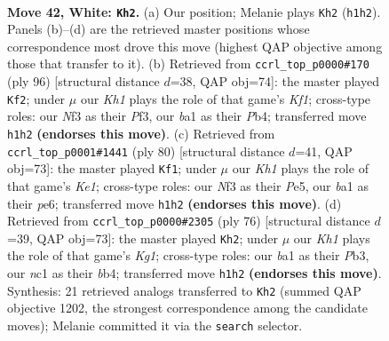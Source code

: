 \documentclass[11pt]{article}
\begin{document}
\clearpage

\begin{figure}[p]\centering
\begin{subfigure}{0.46\textwidth}\centering
\resizebox{\linewidth}{!}{%
\newchessgame
\chessboard[
  setfen={6k1/1p3p2/6p1/p7/7p/5N1P/P5P1/b1n2q1K w - - 2 42},
  showmover=false,
  pgfstyle=straightmove, color=movearrow, markmove={h1-h2}
]}
\caption{}
\end{subfigure}\hfill
\begin{subfigure}{0.46\textwidth}\centering
\resizebox{\linewidth}{!}{%
\newchessgame
\chessboard[
  setfen={6k1/Q2b3p/5B2/1p4p1/1P6/5P1P/6P1/3q1K2 w - - 13 49},
  showmover=false,
  pgfstyle=straightmove, color=movearrow, markmove={f1-f2}
]}
\caption{}
\end{subfigure}
\\[4pt]
\begin{subfigure}{0.46\textwidth}\centering
\resizebox{\linewidth}{!}{%
\newchessgame
\chessboard[
  setfen={1k6/pp2Q3/4pN2/3pP3/1P1P4/4q3/8/4K3 w - - 7 41},
  showmover=false,
  pgfstyle=straightmove, color=movearrow, markmove={e1-f1}
]}
\caption{}
\end{subfigure}\hfill
\begin{subfigure}{0.46\textwidth}\centering
\resizebox{\linewidth}{!}{%
\newchessgame
\chessboard[
  setfen={6k1/3Q2p1/7p/5p2/1bN5/1P5P/5PP1/4q1K1 w - - 1 39},
  showmover=false,
  pgfstyle=straightmove, color=movearrow, markmove={g1-h2}
]}
\caption{}
\end{subfigure}
\caption{\textbf{Move 42, White: \texttt{Kh2}.} (a) Our position; Melanie plays \texttt{Kh2} (\texttt{h1h2}). Panels (b)--(d) are the retrieved master positions whose correspondence most drove this move (highest QAP objective among those that transfer to it). (b) Retrieved from \texttt{ccrl\_top\_p0000\#170} (ply 96) [structural distance $d$=38, QAP obj=74]: the master played \texttt{Kf2}; under $\mu$ our \emph{Kh1} plays the role of that game's \emph{Kf1}; cross-type roles: our \emph{N}f3 as their \emph{P}f3, our \emph{b}a1 as their \emph{P}b4; transferred move \texttt{h1h2} \textbf{(endorses this move)}. (c) Retrieved from \texttt{ccrl\_top\_p0001\#1441} (ply 80) [structural distance $d$=41, QAP obj=73]: the master played \texttt{Kf1}; under $\mu$ our \emph{Kh1} plays the role of that game's \emph{Ke1}; cross-type roles: our \emph{N}f3 as their \emph{P}e5, our \emph{b}a1 as their \emph{p}e6; transferred move \texttt{h1h2} \textbf{(endorses this move)}. (d) Retrieved from \texttt{ccrl\_top\_p0000\#2305} (ply 76) [structural distance $d$=39, QAP obj=73]: the master played \texttt{Kh2}; under $\mu$ our \emph{Kh1} plays the role of that game's \emph{Kg1}; cross-type roles: our \emph{b}a1 as their \emph{P}b3, our \emph{n}c1 as their \emph{b}b4; transferred move \texttt{h1h2} \textbf{(endorses this move)}. Synthesis: 21 retrieved analogs transferred to \texttt{Kh2} (summed QAP objective 1202, the strongest correspondence among the candidate moves); Melanie committed it via the \texttt{search} selector.}
\label{fig:thought-m82}
\end{figure}
\end{document}
